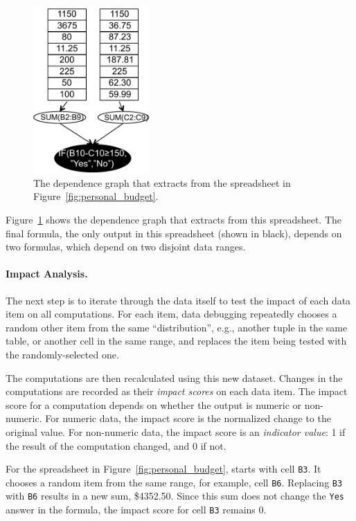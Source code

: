 \begin{figure}[!b]
\centering
\includegraphics[width=1.75in]{dependence-graph}
\caption{The dependence graph that \checkcell{} extracts from the spreadsheet in Figure~\ref{fig:personal_budget}.\label{fig:dependence-graph}}
\end{figure}
 
Figure~\ref{fig:dependence-graph} shows the dependence graph that \checkcell{}
extracts from this spreadsheet. The final formula, the only output in
this spreadsheet (shown in black), depends on two formulas, which depend on two
disjoint data ranges.


\paragraph{Impact Analysis.}
The next step is to iterate through the data itself to test the impact
of each data item on all computations. For each item, data debugging
repeatedly chooses a random other item from the same ``distribution'',
e.g., another tuple in the same table, or another cell in the same
range, and replaces the item being tested with the randomly-selected
one.

The computations are then recalculated using this new dataset. Changes
in the computations are recorded as their \emph{impact scores} on each
data item.  The impact score for a computation depends on whether the
output is numeric or non-numeric. For numeric data, the impact score
is the normalized change to the original value.
For non-numeric data, the impact score is an \emph{indicator value}: 1
if the result of the computation changed, and 0 if not.

For the spreadsheet in Figure~\ref{fig:personal_budget}, \checkcell{}
starts with cell \texttt{B3}. It chooses a random item from the same
range, for example, cell \texttt{B6}. Replacing \texttt{B3}
with \texttt{B6} results in a new sum, \$4352.50. Since this sum does
not change the \texttt{Yes} answer in the formula, the impact score
for cell \texttt{B3} remains 0.

